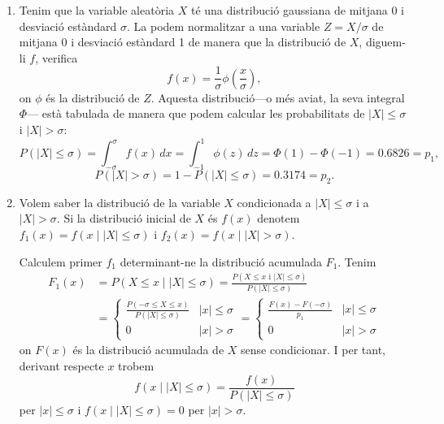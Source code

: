 \documentclass[12pt]{article}
\numberwithin{table}{section}
\numberwithin{figure}{section}
\numberwithin{equation}{section}
\newcommand{\abs}[1]{\left\lvert #1 \right\rvert}
\begin{document}
\begin{enumerate}[label=(\alph*), font=\bfseries \sffamily, wide, labelwidth=!, labelindent=0pt]
	\item Tenim que la variable aleatòria \( X \) té una distribució gaussiana de mitjana 0 i desviació estàndard \( \sigma \). La podem normalitzar a una variable \( Z = X/\sigma \) de mitjana 0 i desviació estàndard 1 de manera que la distribució de \( X \), diguem-li \( f \), verifica
		\begin{equation*}
			f(x) = \frac{1}{\sigma} \phi\left(\frac{x}{\sigma}\right),
		\end{equation*}
		on \( \phi \) és la distribució de \( Z \). Aquesta distribució---o més aviat, la seva integral \( \Phi \)--- està tabulada de manera que podem calcular les probabilitats de \( \abs{X} \leq \sigma \) i \( \abs{X} > \sigma \):
		\begin{equation*}
			P(\abs{X} \leq \sigma) = \int_{-\sigma}^{\sigma} f(x)\,dx = \int_{-1}^{1}\phi(z)\,dz = \Phi(1) - \Phi(-1) = 0.6826 = p_1,
		\end{equation*}
		\begin{equation*}
			P(\abs{X} > \sigma) = 1 - P(\abs{X} \leq \sigma) = 0.3174 = p_2.
		\end{equation*}

	\item Volem saber la distribució de la variable \( X \) condicionada a \( \abs{X} \leq \sigma \) i a \( \abs{X} > \sigma \). Si la distribució inicial de \( X \) és \( f(x) \) denotem \( f_1(x) = f(x \mid \abs{X} \leq \sigma) \) i \( f_2(x) = f(x \mid \abs{X} > \sigma) \).

		Calculem primer \( f_1 \) determinant-ne la distribució acumulada \( F_1 \). Tenim
		\begin{align*}
			F_1(x) &= P(X \leq x \mid \abs{X} \leq \sigma) = \frac{P(X \leq x \text{ i } \abs{X} \leq \sigma)}{P(\abs{X} \leq \sigma)} \\
						 &= \left\{\begin{array}{lr}
			\frac{P(-\sigma \leq X \leq x)}{P(\abs{X} \leq \sigma)} & \abs{x} \leq \sigma \\ 
			0 & \abs{x} > \sigma  
	\end{array} \right. 
	= \left\{\begin{array}{lr}
			\frac{F(x) - F(-\sigma)}{p_1} & \abs{x} \leq \sigma \\ 
			0 & \abs{x} > \sigma  
	\end{array} \right.
\end{align*}
on \( F(x) \) és la distribució acumulada de \( X \) sense condicionar. I per tant, derivant respecte \( x \) trobem
\begin{equation*}
	f(x \mid \abs{X} \leq \sigma) = \frac{f(x)}{P(\abs{X} \leq \sigma)}	
\end{equation*}
per \( \abs{x} \leq \sigma \)	i \( f(x \mid \abs{X} \leq \sigma) = 0 \) per \( \abs{x} > \sigma \). 	


\end{enumerate}
\end{document}
